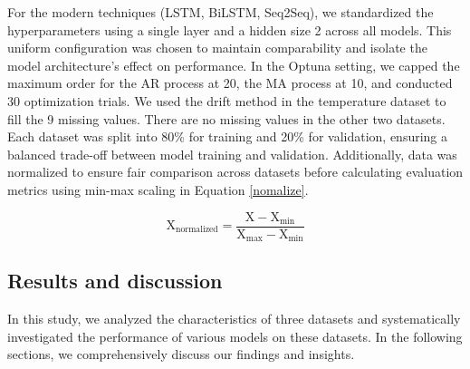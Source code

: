\documentclass[sn-mathphys-num]{sn-jnl}
\theoremstyle{thmstyleone}%
\theoremstyle{thmstyletwo}%
\theoremstyle{thmstylethree}%
\begin{document}
For the modern techniques (LSTM, BiLSTM, Seq2Seq), we standardized the hyperparameters using a single layer and a hidden size 2 across all models. This uniform configuration was chosen to maintain comparability and isolate the model architecture's effect on performance. In the Optuna setting, we capped the maximum order for the AR process at 20, the MA process at 10, and conducted 30 optimization trials. 
We used the drift method in the temperature dataset to fill the 9 missing values. There are no missing values in the other two datasets. Each dataset was split into 80\% for training and 20\% for validation, ensuring a balanced trade-off between model training and validation. Additionally, data was normalized to ensure fair comparison across datasets before calculating evaluation metrics using min-max scaling in Equation \ref{nomalize}.

\begin{equation}
\text{X}_{\text{normalized}} = \frac{\text{X} - \text{X}_{\min}}{\text{X}_{\max} - \text{X}_{\min}}
\label{nomalize}
\end{equation}

\subsection{Results and discussion}
In this study, we analyzed the characteristics of three datasets and systematically investigated the performance of various models on these datasets. In the following sections, we comprehensively discuss our findings and insights.
\end{document}
